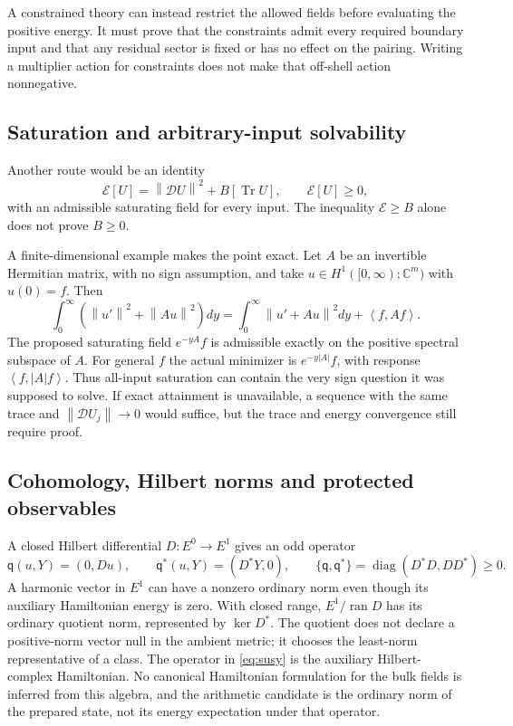 \documentclass[11pt]{article}
\numberwithin{equation}{section}
\theoremstyle{definition}
\theoremstyle{remark}
\newcommand{\C}{\mathbb C}
\newcommand{\ran}{\operatorname{ran}}
\newcommand{\qq}{\mathsf q}
\newcommand{\norm}[1]{\left\lVert#1\right\rVert}
\newcommand{\ip}[2]{\left\langle#1,#2\right\rangle}
\begin{document}
A constrained theory can instead restrict the allowed fields before evaluating the positive energy. It must prove that the constraints admit every required boundary input and that any residual sector is fixed or has no effect on the pairing. Writing a multiplier action for constraints does not make that off-shell action nonnegative.

\subsection{Saturation and arbitrary-input solvability}
Another route would be an identity
\begin{equation}
 \mathcal E[U]=\norm{\mathcal D U}^2+B[\operatorname{Tr}U],
 \qquad \mathcal E[U]\ge0,
 \label{eq:saturation}
\end{equation}
with an admissible saturating field for every input. The inequality $\mathcal E\ge B$ alone does not prove $B\ge0$.

A finite-dimensional example makes the point exact. Let $A$ be an invertible Hermitian matrix, with no sign assumption, and take $u\in H^1([0,\infty);\C^m)$ with $u(0)=f$. Then
\begin{equation}
 \int_0^\infty(\norm{u'}^2+\norm{Au}^2)dy
 =\int_0^\infty\norm{u'+Au}^2dy+\ip{f}{Af}.
\end{equation}
The proposed saturating field $e^{-yA}f$ is admissible exactly on the positive spectral subspace of $A$. For general $f$ the actual minimizer is $e^{-y|A|}f$, with response $\ip{f}{|A|f}$. Thus all-input saturation can contain the very sign question it was supposed to solve. If exact attainment is unavailable, a sequence with the same trace and $\norm{\mathcal DU_j}\to0$ would suffice, but the trace and energy convergence still require proof.

\subsection{Cohomology, Hilbert norms and protected observables}
A closed Hilbert differential $D:E^0\to E^1$ gives an odd operator
\begin{equation}
 \qq(u,Y)=(0,Du),\qquad
 \qq^*(u,Y)=(D^*Y,0),\qquad
 \{\qq,\qq^*\}=\operatorname{diag}(D^*D,DD^*)\ge0.
 \label{eq:susy}
\end{equation}
A harmonic vector in $E^1$ can have a nonzero ordinary norm even though its auxiliary Hamiltonian energy is zero. With closed range, $E^1/\ran D$ has its ordinary quotient norm, represented by $\ker D^*$. The quotient does not declare a positive-norm vector null in the ambient metric; it chooses the least-norm representative of a class. The operator in \eqref{eq:susy} is the auxiliary Hilbert-complex Hamiltonian. No canonical Hamiltonian formulation for the bulk fields is inferred from this algebra, and the arithmetic candidate is the ordinary norm of the prepared state, not its energy expectation under that operator.
\end{document}
